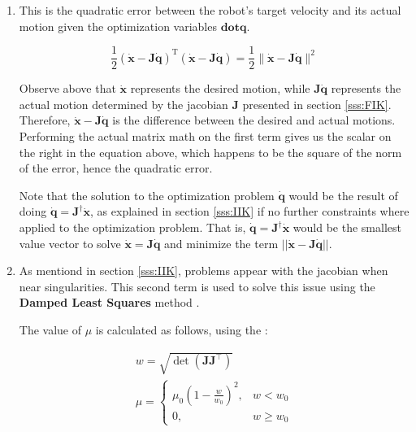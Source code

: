 \begin{enumerate}
    \item This is the quadratic error between the robot's target velocity and its actual motion given the optimization variables $\mathbf{dot{q}}$.

    \begin{equation*}
            \frac{1}{2}\left(\mathbf{\dot{x}-J\dot{q}}\right)^{\mathrm{T}} \left(\mathbf{\dot{x}-J\dot{q}}\right) = \frac{1}{2}\|\mathbf{\dot{x}-J\dot{q}}\|^{2}
    \end{equation*}

    Observe above that $\mathbf{\dot{x}}$ represents the desired motion, while $\mathbf{J\dot{q}}$ represents the actual motion determined by the jacobian $\mathbf{J}$ presented in section \ref{sss:FIK}. Therefore, $\mathbf{\dot{x}-J\dot{q}}$ is the difference between the desired and actual motions. Performing the actual matrix math on the first term gives us the scalar on the right in the equation above, which happens to be the square of the norm of the error, hence the quadratic error.

    Note that the solution to the optimization problem $\dot{\mathbf{q}}$ would be the result of doing $\mathbf{\dot{q} = J^{\dagger} \dot{x}}$, as explained in section \ref{sss:IIK} if no further constraints where applied to the optimization problem. That is, $\mathbf{\dot{q}= J^{\dagger}\dot{x}}$ would be the smallest value vector to solve $\mathbf{\dot{x} = J\dot{q}}$ and minimize the term $||\mathbf{\dot{x} - J\dot{q}}||$.

    \item As mentiond in section \ref{sss:IIK}, problems appear with the jacobian when near singularities. This second term is used to solve this issue using the \textbf{Damped Least Squares} method \cite{nakamura1986inverse} \cite{wampler1986manipulator}.

    The value of $\mu$ is calculated as follows, using the %
    :

    \begin{equation*}
        \begin{array}{l}
            w=\sqrt{\operatorname{det}\left(\mathbf{J} \mathbf{J}^{\top}\right)} \\
            \mu=\left\{\begin{array}{ll}
            \mu_{0}\left(1-\frac{w}{w_{0}}\right)^{2}, & w<w_{0} \\
            0, & w \geq w_{0}
            \end{array}\right.
        \end{array}
    \end{equation*}
\end{enumerate}


